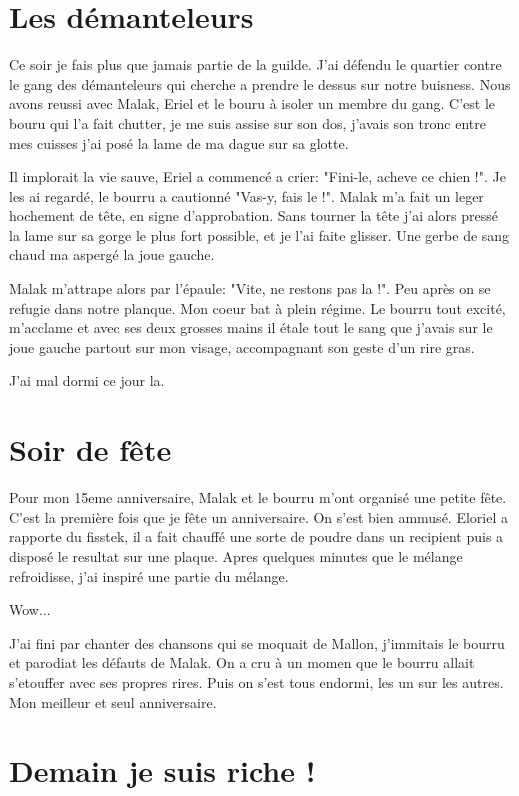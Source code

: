 \documentclass[10pt,a4paper,twoside,twocolumn,openany]{book}
\begin{document}
\section{Les démanteleurs}

Ce soir je fais plus que jamais partie de la guilde. J'ai défendu le quartier contre le gang des
démanteleurs qui cherche a prendre le dessus sur notre buisness.
Nous avons reussi avec Malak, Eriel et le bouru à isoler un membre du gang. C'est le bouru
qui l'a fait chutter, je me suis assise sur son dos, j'avais son tronc entre mes cuisses j'ai posé 
la lame de ma dague sur sa glotte. 

Il implorait la vie sauve, Eriel a commencé a crier: "Fini-le, acheve ce chien !". Je les ai regardé,
le bourru a cautionné "Vas-y, fais le !". Malak m'a fait un leger hochement de tête, en signe
d'approbation. Sans tourner la tête j'ai alors pressé la lame sur sa gorge le plus fort possible,
et je l'ai faite glisser. Une gerbe de sang chaud ma aspergé la joue gauche.

Malak m'attrape alors par l'épaule: "Vite, ne restons pas la !". Peu après on se refugie dans notre planque.
Mon coeur bat à plein régime. Le bourru tout excité, m'acclame et avec ses deux grosses mains il étale
tout le sang que j'avais sur le joue gauche partout sur mon visage, accompagnant son geste d'un rire gras. 

J'ai mal dormi ce jour la.

\section{Soir de fête}

Pour mon 15eme anniversaire, Malak et le bourru m'ont organisé une petite fête. C'est la première fois
que je fête un anniversaire. On s'est bien ammusé. Eloriel a rapporte du fisstek, il a fait chauffé une 
sorte de poudre dans un recipient puis a disposé le resultat sur une plaque. Apres quelques minutes
que le mélange refroidisse, j'ai inspiré une partie du mélange.

Wow...

J'ai fini par chanter des chansons qui se moquait de Mallon, j'immitais le bourru et parodiat
les défauts de Malak. On a cru à un momen que le bourru allait s'etouffer avec ses propres rires.
Puis on s'est tous endormi, les un sur les autres. Mon meilleur et seul anniversaire.

\section{Demain je suis riche !}
\end{document}
